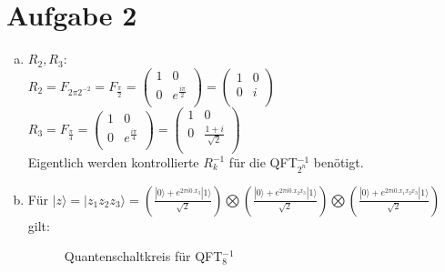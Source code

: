 \documentclass[a4paper]{scrartcl}
\begin{document}
\section*{Aufgabe 2}
\begin{enumerate}[a)]
\item
$R_2, R_3:$\\
$R_2=F_{2\pi 2^{-2}}=F_{\frac{\pi}{2}} = 
\begin{pmatrix}
1 & 0 \\ 0 & e^{\frac{i \pi}{2}} \\
\end{pmatrix} = \begin{pmatrix}
1 & 0 \\ 0 & i\\
\end{pmatrix}$\\
$R_3=F_{\frac{\pi}{4}} = 
\begin{pmatrix}
1 & 0 \\ 0 & e^{\frac{i \pi}{4}} \\
\end{pmatrix} = \begin{pmatrix}
1 & 0 \\ 0 & \frac{1+i}{\sqrt{2}}\\
\end{pmatrix}$ \\
Eigentlich werden kontrollierte $R_k^{-1}$ für die QFT$_{2^n}^{-1}$ benötigt.

\item Für $|z\rangle = |z_1 z_2 z_3\rangle= (\frac{|0\rangle+e^{2\pi i0.x_3} |1\rangle }{\sqrt{2}})\bigotimes(\frac{|0\rangle+e^{2\pi i0.x_2x_3} |1\rangle }{\sqrt{2}})\bigotimes(\frac{|0\rangle+e^{2\pi i0.x_1x_2x_3} |1\rangle }{\sqrt{2}})$ gilt:

\begin{figure}[htp] 
\caption{Quantenschaltkreis für QFT$_{8}^{-1}$}
\end{figure}


\end{enumerate}
\end{document}
